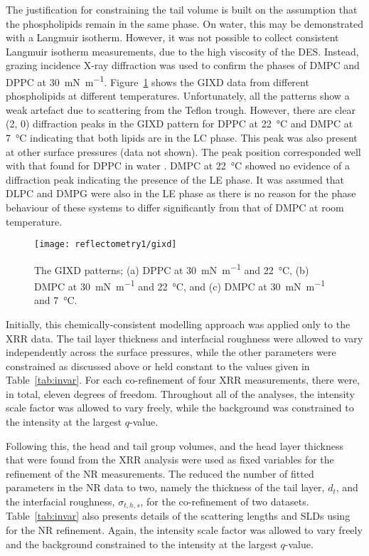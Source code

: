 The justification for constraining the tail volume is built on the assumption that the phospholipids remain in the same phase.
On water, this may be demonstrated with a Langmuir isotherm.
However, it was not possible to collect consistent Langmuir isotherm measurements, due to the high viscosity of the DES.
Instead, grazing incidence X-ray diffraction was used to confirm the phases of DMPC and DPPC at \SI{30}{\milli\newton\per\meter}.
Figure~\ref{fig:gixd} shows the GIXD data from different phospholipids at different temperatures.
Unfortunately, all the patterns show a weak artefact due to scattering from the Teflon trough.
However, there are clear (2, 0) diffraction peaks in the GIXD pattern for DPPC at \SI{22}{\celsius} and DMPC at \SI{7}{\celsius} indicating that both lipids are in the LC phase.
This peak was also present at other surface pressures (data not shown).
The peak position corresponded well with that found for DPPC in water \cite{watkins_structure_2009}.
DMPC at \SI{22}{\celsius} showed no evidence of a diffraction peak indicating the presence of the LE phase.
It was assumed that DLPC and DMPG were also in the LE phase as there is no reason for the phase behaviour of these systems to differ significantly from that of DMPC at room temperature.
%
\begin{figure}
    \centering
    \texttt{[image: reflectometry1/gixd]}
    \caption{The GIXD patterns; (a) DPPC at \SI{30}{\milli\newton\per\meter} and \SI{22}{\celsius}, (b) DMPC at \SI{30}{\milli\newton\per\meter} and \SI{22}{\celsius}, and (c) DMPC at \SI{30}{\milli\newton\per\meter} and \SI{7}{\celsius}.}
    \label{fig:gixd}
\end{figure}
%

Initially, this chemically-consistent modelling approach was applied only to the XRR data.
The tail layer thickness and interfacial roughness were allowed to vary independently across the surface pressures, while the other parameters were constrained as discussed above or held constant to the values given in Table~\ref{tab:invar}.
For each co-refinement of four XRR measurements, there were, in total, eleven degrees of freedom.
Throughout all of the analyses, the intensity scale factor was allowed to vary freely, while the background was constrained to the intensity at the largest $q$-value.

Following this, the head and tail group volumes, and the head layer thickness that were found from the XRR analysis were used as fixed variables for the refinement of the NR measurements.
The reduced the number of fitted parameters in the NR data to two, namely the thickness of the tail layer, $d_t$, and the interfacial roughness, $\sigma_{t,h,s}$, for the co-refinement of two datasets.
Table~\ref{tab:invar} also presents details of the scattering lengths and SLDs using for the NR refinement.
Again, the intensity scale factor was allowed to vary freely and the background constrained to the intensity at the largest $q$-value.

